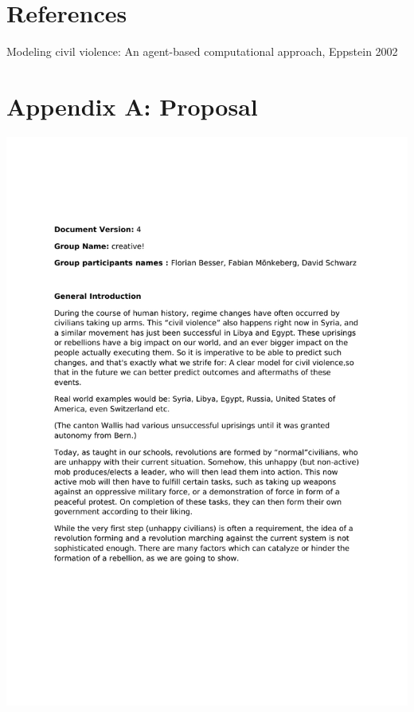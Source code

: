 \documentclass[11pt]{article}
\begin{document}
\newpage

\section{References}

Modeling civil violence: An agent-based computational approach, Eppstein 2002

\section{Appendix A: Proposal}

\includegraphics[bb=1.0in 1.0in 7.5in 10in,page=1]{Proposal.pdf}
\newpage
\end{document}
